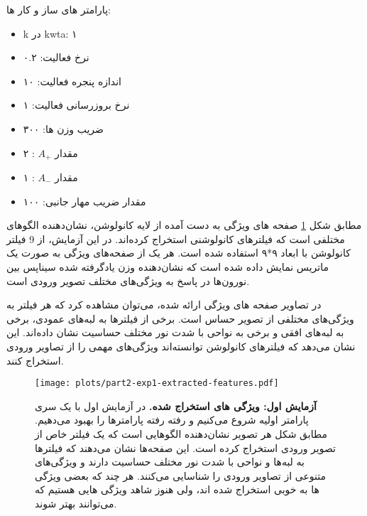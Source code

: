 \begin{multicols}{3}
                پارامتر های ساز و کار ها:
                \begin{itemize}
                \item k در kwta: ۱
                \item نرخ فعالیت: ۰.۲
                \item اندازه پنجره فعالیت: ۱۰
                \item نرخ بروزرسانی فعالیت: ۱
                \item ضریب وزن ها: ۳۰۰
                \item مقدار $A_{+}$ : ۲
                \item مقدار $A_{-}$ : ۱
                \item مقدار ضریب مهار جانبی: ۱۰۰
                \end{itemize}
                \end{multicols}

                مطابق شکل 
                \ref{fig:part2-exp1-extracted-features}
                صفحه های ویژگی به دست آمده از لایه کانولوشن، نشان‌دهنده الگوهای مختلفی است که فیلترهای کانولوشنی استخراج کرده‌اند. در این آزمایش، از
                9
                فیلتر کانولوشن با ابعاد 
                ۹*۹
                استفاده شده است. هر یک از صفحه‌های ویژگی به صورت یک ماتریس نمایش داده شده است که نشان‌دهنده وزن یادگرفته شده سیناپس بین نورون‌ها در پاسخ به ویژگی‌های مختلف تصویر ورودی است.

                در تصاویر صفحه های ویژگی ارائه شده، می‌توان مشاهده کرد که هر فیلتر به ویژگی‌های مختلفی از تصویر حساس است. برخی از فیلترها به لبه‌های عمودی، برخی به لبه‌های افقی و برخی به نواحی با شدت نور مختلف حساسیت نشان داده‌اند. این نشان می‌دهد که فیلترهای کانولوشن توانسته‌اند ویژگی‌های مهمی را از تصاویر ورودی استخراج کنند.

                \begin{figure}[!ht]
                    \centering
                    \texttt{[image: plots/part2-exp1-extracted-features.pdf]} 
                    \captionsetup{width=.9\linewidth}
                    \caption{\textbf{آزمایش اول: ویژگی های استخراج شده.} در آزمایش اول با یک سری پارامتر اولیه شروع می‌کنیم و رفته رفته پارامترها را بهبود می‌دهیم. مطابق شکل  هر تصویر نشان‌دهنده الگوهایی است که یک فیلتر خاص از تصویر ورودی استخراج کرده است. این صفحه‌ها نشان می‌دهند که فیلترها به لبه‌ها و نواحی با شدت نور مختلف حساسیت دارند و ویژگی‌های متنوعی از تصاویر ورودی را شناسایی می‌کنند. هر چند که بعضی ویژگی ها به خوبی استخراج شده اند، ولی هنوز شاهد ویژگی هایی هستیم که می‌توانند بهتر شوند.
                    }
                    \label{fig:part2-exp1-extracted-features}
                \end{figure}

